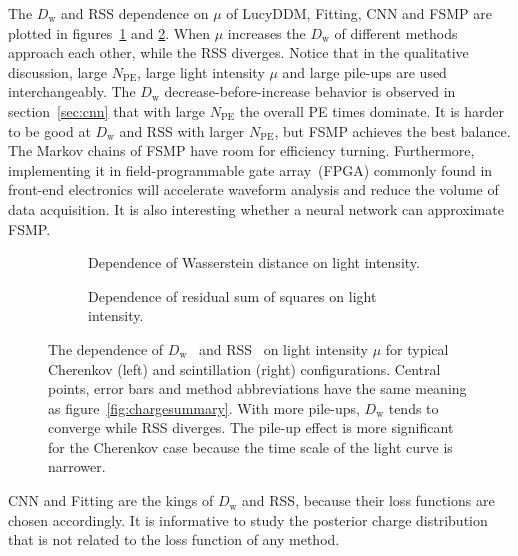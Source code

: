 The $D_\mathrm{w}$ and RSS dependence on $\mu$ of LucyDDM, Fitting, CNN and FSMP are plotted in figures~\ref{fig:wdistsummary} and \ref{fig:rsssummary}.  When $\mu$ increases the $D_\mathrm{w}$ of different methods approach each other, while the RSS diverges.  Notice that in the qualitative discussion, large $N_\mathrm{PE}$, large light intensity $\mu$ and large pile-ups are used interchangeably.  The $D_\mathrm{w}$ decrease-before-increase behavior is observed in section~\ref{sec:cnn} that with large $N_\mathrm{PE}$ the overall PE times dominate.  It is harder to be good at $D_\mathrm{w}$ and RSS with larger $N_\mathrm{PE}$, but FSMP achieves the best balance.  The Markov chains of FSMP have room for efficiency turning.  Furthermore, implementing it in field-programmable gate array~(FPGA) commonly found in front-end electronics will accelerate waveform analysis and reduce the volume of data acquisition.  It is also interesting whether a neural network can approximate FSMP.
\begin{figure}[H]
  \begin{subfigure}[b]{\textwidth}
    \resizebox{\textwidth}{!}{}
    \caption{\label{fig:wdistsummary}Dependence of Wasserstein distance on light intensity.}
  \end{subfigure}

  \vspace{0.5em}
  \begin{subfigure}[b]{\textwidth}
    \resizebox{\textwidth}{!}{}
    \caption{\label{fig:rsssummary}Dependence of residual sum of squares on light intensity.}
  \end{subfigure}
  \caption{\label{fig:summary}The dependence of $D_\mathrm{w}$~ and RSS~ on light intensity $\mu$ for typical Cherenkov (left) and scintillation (right) configurations.  Central points, error bars and method abbreviations have the same meaning as figure~\ref{fig:chargesummary}.  With more pile-ups, $D_\mathrm{w}$ tends to converge while RSS diverges.  The pile-up effect is more significant for the Cherenkov case because the time scale of the light curve is narrower. }
\end{figure}

CNN and Fitting are the kings of $D_\mathrm{w}$ and RSS, because their loss functions are chosen accordingly.  It is informative to study the posterior charge distribution that is not related to the loss function of any method.

